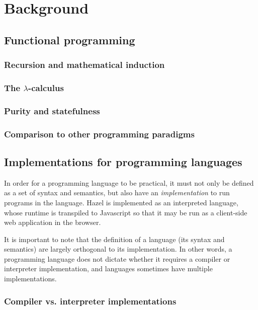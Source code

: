 \section{Background}
\label{sec:background}

\subsection{Functional programming}
\label{sec:fp}

\subsubsection{Recursion and mathematical induction}
\label{sec:recursion}

\subsubsection{The $\lambda$-calculus}
\label{sec:lambda_calculus}

\subsubsection{Purity and statefulness}
\label{sec:purity}

\subsubsection{Comparison to other programming paradigms}
\label{sec:fp_comp}

\subsection{Implementations for programming languages}
\label{sec:interpreters}

In order for a programming language to be practical, it must not only be defined as a set of syntax and semantics, but also have an \textit{implementation} to run programs in the language. Hazel is implemented as an interpreted language, whose runtime is transpiled to Javascript so that it may be run as a client-side web application in the browser.

It is important to note that the definition of a language (its syntax and semantics) are largely orthogonal to its implementation. In other words, a programming language does not dictate whether it requires a compiler or interpreter implementation, and languages sometimes have multiple implementations.

\subsubsection{Compiler vs. interpreter implementations}
\label{sec:comp_vs_interp}

